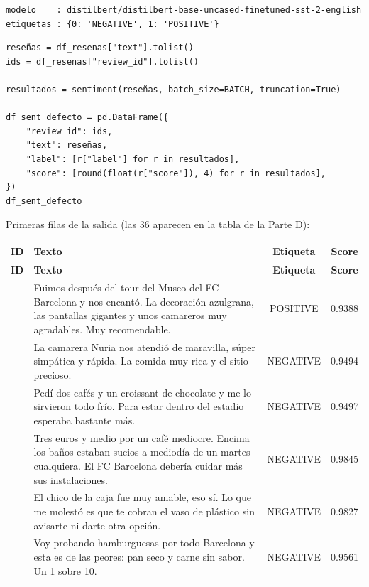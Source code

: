 \documentclass[12pt,a4paper]{article}
\begin{document}
\begin{lstlisting}[style=salida]
modelo    : distilbert/distilbert-base-uncased-finetuned-sst-2-english
etiquetas : {0: 'NEGATIVE', 1: 'POSITIVE'}
\end{lstlisting}

\begin{lstlisting}[style=codigo]
reseñas = df_resenas["text"].tolist()
ids = df_resenas["review_id"].tolist()

resultados = sentiment(reseñas, batch_size=BATCH, truncation=True)

df_sent_defecto = pd.DataFrame({
    "review_id": ids,
    "text": reseñas,
    "label": [r["label"] for r in resultados],
    "score": [round(float(r["score"]), 4) for r in resultados],
})
df_sent_defecto
\end{lstlisting}

Primeras filas de la salida (las 36 aparecen en la tabla de la Parte D):

{\footnotesize\renewcommand{\arraystretch}{1.3}
\begin{longtable}{|>{\raggedright\arraybackslash}p{1.0cm}|>{\raggedright\arraybackslash}p{10.2cm}|c|c|}
\hline
\textbf{ID} & \textbf{Texto} & \textbf{Etiqueta} & \textbf{Score} \\ \hline
\endfirsthead
\hline
\textbf{ID} & \textbf{Texto} & \textbf{Etiqueta} & \textbf{Score} \\ \hline
\endhead
1 & Fuimos después del tour del Museo del FC Barcelona y nos encantó. La decoración azulgrana, las pantallas gigantes y unos camareros muy agradables. Muy recomendable. & POSITIVE & 0.9388 \\ \hline
2 & La camarera Nuria nos atendió de maravilla, súper simpática y rápida. La comida muy rica y el sitio precioso. & NEGATIVE & 0.9494 \\ \hline
3 & Pedí dos cafés y un croissant de chocolate y me lo sirvieron todo frío. Para estar dentro del estadio esperaba bastante más. & NEGATIVE & 0.9497 \\ \hline
4 & Tres euros y medio por un café mediocre. Encima los baños estaban sucios a mediodía de un martes cualquiera. El FC Barcelona debería cuidar más sus instalaciones. & NEGATIVE & 0.9845 \\ \hline
5 & El chico de la caja fue muy amable, eso sí. Lo que me molestó es que te cobran el vaso de plástico sin avisarte ni darte otra opción. & NEGATIVE & 0.9827 \\ \hline
6 & Voy probando hamburguesas por todo Barcelona y esta es de las peores: pan seco y carne sin sabor. Un 1 sobre 10. & NEGATIVE & 0.9561 \\ \hline
\end{longtable}}
\end{document}
